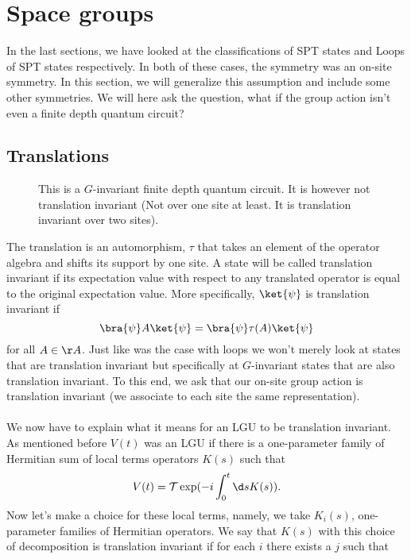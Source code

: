 \section{Space groups}
In the last sections, we have looked at the classifications of SPT states and Loops of SPT states respectively. In both of these cases, the symmetry was an on-site symmetry. In this section, we will generalize this assumption and include some other symmetries. We will here ask the question, what if the group action isn't even a finite depth quantum circuit?
\subsection{Translations}
\begin{figure}
	\scalebox{0.7}{
		
	}
	\caption{This is a $G$-invariant finite depth quantum circuit. It is however not translation invariant (Not over one site at least. It is translation invariant over two sites).}
	\label{fig:Z_2_and_TranslationInvariantStates}
\end{figure}
The translation is an automorphism, $\tau$ that takes an element of the operator algebra and shifts its support by one site. A state will be called translation invariant if its expectation value with respect to any translated operator is equal to the original expectation value. More specifically, $\ket{\psi}$ is translation invariant if
\begin{equation}
\bra{\psi}A\ket{\psi}=\bra{\psi}\tau(A)\ket{\psi}
\end{equation}
for all $A\in\AA$. Just like was the case with loops we won't merely look at states that are translation invariant but specifically at $G$-invariant states that are also translation invariant. To this end, we ask that our on-site group action is translation invariant (we associate to each site the same representation).\\\\
We now have to explain what it means for an LGU to be translation invariant. As mentioned before $V(t)$ was an LGU if there is a one-parameter family of Hermitian sum of local terms operators $K(s)$ such that
\begin{equation}
V(t)=\mathcal{T}\exp(-i\int_{0}^{t}\d s K(s)).
\end{equation}
Now let's make a choice for these local terms, namely, we take $K_i(s)$, one-parameter families of Hermitian operators. We say that $K(s)$ with this choice of decomposition is translation invariant if for each $i$ there exists a $j$ such that
